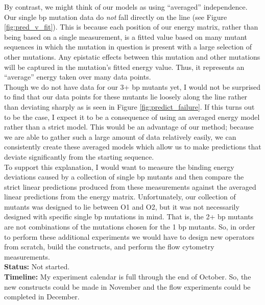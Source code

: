\documentclass[10pt,letterpaper]{article}
\begin{document}
\noindent By contrast, we might think of our models as using ``averaged''
independence. Our single bp mutation data do \textit{not} fall directly
on the line (see Figure \ref{fig:pred_v_fit}). This is because each position of
our energy matrix, rather than being based on a single measurement, is a fitted
value based on many mutant sequences in which the mutation in question is
present with a large selection of other mutations. Any epistatic effects between
this mutation and other mutations will be captured in the mutation's fitted
energy value. Thus, it represents an ``average'' energy taken over many data
points. \\

\noindent Though we do not have data for our 3+ bp mutants yet, I would not be
surprised to find that our data points for these mutants lie loosely along the
line rather than deviating sharply as is seen in Figure \ref{fig:predict_failure}. If this turns out to be the case, I expect it to be
a consequence of using an averaged energy model rather than a strict model. This would be an advantage of our method; because we are able to gather such a large amount of data relatively easily, we can consistently create these averaged models which allow us to make predictions that deviate significantly from the starting sequence. \\

\noindent To support this explanation, I would want to measure the binding energy deviations caused by a collection of single bp mutants and then compare the strict linear predictions produced from these measurements against the averaged linear predictions from the energy matrix. Unfortunately, our collection of mutants was designed to lie between O1 and O2, but it was not necessarily designed with specific single bp mutations in mind. That is, the 2+ bp mutants are not combinations of the mutations chosen for the 1 bp mutants. So, in order to perform these additional experiments we would have to design new operators from scratch, build the constructs, and perform the flow cytometry measurements. \\

\noindent \textbf{Status:} Not started.\\

\noindent \textbf{Timeline:} My experiment calendar is full through the end of October. So, the new constructs could be made in November and the flow experiments could be completed in December.




\end{document}
